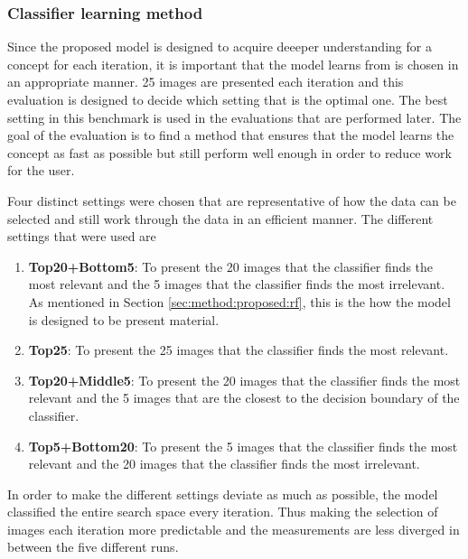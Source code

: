\subsubsection{Classifier learning method}
\label{sec:method:eval:param:learning}
Since the proposed model is designed to acquire deeeper understanding for a concept for each iteration, it is important that the model learns from is chosen in an appropriate manner. 25 images are presented each iteration and this evaluation is designed to decide which setting that is the optimal one. The best setting in this benchmark is used in the evaluations that are performed later. 
The goal of the evaluation is to find a method that ensures that the model learns the concept as fast as possible but still perform well enough in order to reduce work for the user. 

Four distinct settings were chosen that are representative of how the data can be selected and still work through the data in an efficient manner. The different settings that were used are
\begin{enumerate}
	\item \textbf{Top20+Bottom5}: To present the 20 images that the classifier finds the most relevant and the 5 images that the classifier finds the most irrelevant. As mentioned in Section \ref{sec:method:proposed:rf}, this is the how the model is designed to be present material.  
	\item \textbf{Top25}: To present the 25 images that the classifier finds the most relevant. 
	\item \textbf{Top20+Middle5}: To present the 20 images that the classifier finds the most relevant and the 5 images that are the closest to the decision boundary of the classifier. 
	\item \textbf{Top5+Bottom20}: To present the 5 images that the classifier finds the most relevant and the 20 images that the classifier finds the most irrelevant. 
\end{enumerate}
In order to make the different settings deviate as much as possible, the model classified the entire search space every iteration. Thus making the selection of images each iteration more predictable and the measurements are less diverged in between the five different runs.

